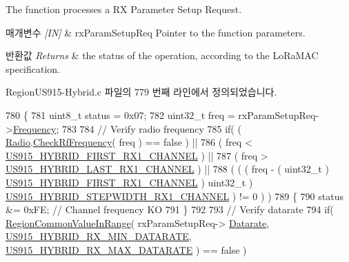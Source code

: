 The function processes a RX Parameter Setup Request. 


\begin{DoxyParams}{매개변수}
{\em \mbox{[}\+I\+N\mbox{]}} & rx\+Param\+Setup\+Req Pointer to the function parameters.\\
\hline
\end{DoxyParams}

\begin{DoxyRetVals}{반환값}
{\em Returns} & the status of the operation, according to the Lo\+Ra\+M\+AC specification. \\
\hline
\end{DoxyRetVals}


Region\+U\+S915-\/\+Hybrid.\+c 파일의 779 번째 라인에서 정의되었습니다.


\begin{DoxyCode}
780 \{
781     uint8\_t status = 0x07;
782     uint32\_t freq = rxParamSetupReq->\mbox{\hyperlink{structs_rx_param_setup_req_params_ade3d190636488dad9a89b19446b7acf1}{Frequency}};
783 
784     \textcolor{comment}{// Verify radio frequency}
785     \textcolor{keywordflow}{if}( ( \mbox{\hyperlink{sx1276mb1las_8c_acf9fe61a72c16fa29a0dc449d23e3820}{Radio}}.\mbox{\hyperlink{struct_radio__s_a984f224d5ef26fb8a35f77d664f384df}{CheckRfFrequency}}( freq ) == false ) ||
786         ( freq < \mbox{\hyperlink{group___r_e_g_i_o_n_u_s915_h_y_b_ga28e4aa61b58960f8cf317c0d891204f8}{US915\_HYBRID\_FIRST\_RX1\_CHANNEL}} ) ||
787         ( freq > \mbox{\hyperlink{group___r_e_g_i_o_n_u_s915_h_y_b_ga27ad9f504f6efe05c69bc1c41cf4ae28}{US915\_HYBRID\_LAST\_RX1\_CHANNEL}} ) ||
788         ( ( ( freq - ( uint32\_t ) \mbox{\hyperlink{group___r_e_g_i_o_n_u_s915_h_y_b_ga28e4aa61b58960f8cf317c0d891204f8}{US915\_HYBRID\_FIRST\_RX1\_CHANNEL}} ) %
      uint32\_t ) \mbox{\hyperlink{group___r_e_g_i_o_n_u_s915_h_y_b_ga1b77da2ffd6ac645137695b2bccdff08}{US915\_HYBRID\_STEPWIDTH\_RX1\_CHANNEL}} ) != 0 ) )
789     \{
790         status &= 0xFE; \textcolor{comment}{// Channel frequency KO}
791     \}
792 
793     \textcolor{comment}{// Verify datarate}
794     \textcolor{keywordflow}{if}( \mbox{\hyperlink{group___r_e_g_i_o_n_c_o_m_m_o_n_gafdd1c80d953e18d755a631b72a9c3bd3}{RegionCommonValueInRange}}( rxParamSetupReq->
      \mbox{\hyperlink{structs_rx_param_setup_req_params_ae2f6080f3aa0e9485c55513ca56bb24d}{Datarate}}, \mbox{\hyperlink{group___r_e_g_i_o_n_u_s915_h_y_b_gaf3c327837e52fbc665c3857f3731c5fe}{US915\_HYBRID\_RX\_MIN\_DATARATE}}, 
      \mbox{\hyperlink{group___r_e_g_i_o_n_u_s915_h_y_b_ga10a143c061143776288b241e17c1b58d}{US915\_HYBRID\_RX\_MAX\_DATARATE}} ) == false )

\end{DoxyCode}
